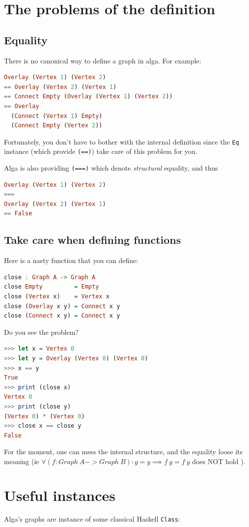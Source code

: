 \documentclass[10pt,a4paper]{article}
\begin{document}
\section{The problems of the definition}
\subsection{Equality}
There is no canonical way to define a graph in alga. For example:
\begin{lstlisting}[language=Haskell, frame=single]
Overlay (Vertex 1) (Vertex 2)
== Overlay (Vertex 2) (Vertex 1)
== Connect Empty (Overlay (Vertex 1) (Vertex 2))
== Overlay 
  (Connect (Vertex 1) Empty)
  (Connect Empty (Vertex 2))
\end{lstlisting}
 
Fortunately, you don't have to bother with the internal definition since the \verb|Eq| instance (which provide \verb|(==)|) take care of this problem for you.

Alga is also providing \verb|(===)| which denote \emph{structural} equality, and thus
 
\begin{lstlisting}[language=Haskell, frame=single]
Overlay (Vertex 1) (Vertex 2)
===
Overlay (Vertex 2) (Vertex 1)
== False
\end{lstlisting}

\subsection{Take care when defining functions}
Here is a nasty function that you can define:
\begin{lstlisting}[language=Haskell, frame=single]
close : Graph A -> Graph A
close Empty         = Empty
close (Vertex x)    = Vertex x
close (Overlay x y) = Connect x y
close (Connect x y) = Connect x y
\end{lstlisting}

Do you see the problem?
\begin{lstlisting}[language=Haskell, frame=single]
>>> let x = Vertex 0
>>> let y = Overlay (Vertex 0) (Vertex 0)
>>> x == y
True
>>> print (close x)
Vertex 0
>>> print (close y)
(Vertex 0) * (Vertex 0)
>>> close x == close y
False
\end{lstlisting}
For the moment, one can mess the internal structure, and the equality loose its meaning (ie $\forall (f: Graph \ A -> Graph \ B) : g = y \implies f \ g = f \ y$ does NOT hold ).
 
\section{Useful instances}
Alga's graphs are instance of some classical Haskell \verb|Class|:
\end{document}
